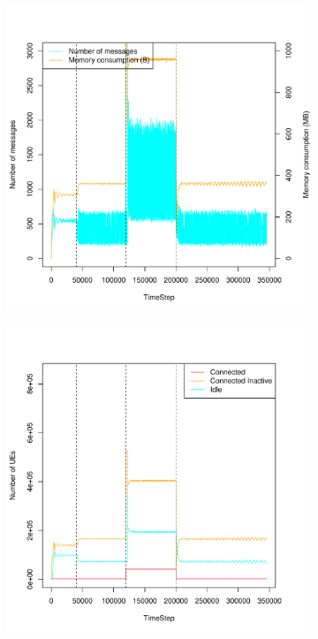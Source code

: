 \documentclass[a4j]{ujarticle}
\begin{document}
\begin{figure}[htbp]
\begin{subfigure}{0.49\hsize}
 \end{subfigure}
 \par\bigskip %
 \begin{subfigure}{0.49\hsize}
   \centering
   \includegraphics[width=1.0\hsize]{scenario_7_signaling_and_memoryload_vs_timeStep_0_691200_1-5_0_0_0_shortFrequency_addIn100s_random.pdf}
   \label{subfig:scenario_7_signaling_and_memoryload_vs_timeStep_0_691200_1-5_0_0_0_shortFrequency_addIn100s_random}
 \end{subfigure}
 \begin{subfigure}{0.49\hsize}
   \centering
   \includegraphics[width=1.0\hsize]{scenario_7_stateBreakdown_0_691200_1-5_0_0_0_shortFrequency_addIn100s_random.pdf}

\end{subfigure}
\end{figure}
\end{document}
